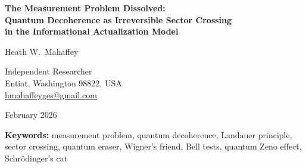 \documentclass[12pt,letterpaper]{article}
\newcommand{\IAM}{\textsc{iam}}
\newcommand{\kB}{k_{\mathrm{B}}}
\begin{document}
\doublespacing

\begin{titlepage}
\centering
\vspace*{2cm}

{\LARGE\bfseries The Measurement Problem Dissolved:\\[0.5em]
Quantum Decoherence as Irreversible Sector Crossing\\
in the Informational Actualization Model\par}

\vspace{2cm}

{\large Heath W.\ Mahaffey\par}
\vspace{0.5cm}
{\normalsize Independent Researcher\\
Entiat, Washington 98822, USA\\
\href{mailto:hmahaffeyges@gmail.com}{hmahaffeyges@gmail.com}\par}

\vspace{1.5cm}
{\normalsize February 2026\par}

\vspace{2cm}

\begin{abstract}
\noindent
The measurement problem --- what constitutes a measurement, why does
measurement cause collapse, and what role does the observer play --- has
been debated for a century. We show that the dual-sector framework of the
Informational Actualization Model (\IAM), validated at cosmological scales
through 17 converged Planck~2018 MCMC chains ($\Delta\chi^2 = +0.54$
best-fit, $\sigma_8 = 0.800$, R-1 $< 0.01$ for all chains), dissolves
the measurement problem entirely. A measurement is any irreversible
thermodynamic interaction between a quantum system and matter that
dissipates energy $Q \geq \kB T \ln 2$ (the Landauer threshold). The
photon sector ($\Sigma = 1$) is immune to gravitational decoherence; the
matter sector ($\mu < 1$) decoheres on timescales determined by the
gravitational self-energy. No observer is required. No consciousness is
involved. We apply this criterion to the double slit experiment,
Wheeler's delayed choice, the quantum eraser, Schr\"{o}dinger's cat,
entanglement and Bell tests, Wigner's friend, and the quantum Zeno
effect. Each paradox is resolved by the same mechanism: sector crossing
through irreversible information production. We derive quantitative
predictions for each case and identify three experiments that discriminate
between \IAM{} and standard quantum mechanics using existing laboratory
infrastructure.
\end{abstract}

\vspace{1cm}
{\small\noindent\textbf{Keywords:} measurement problem, quantum
decoherence, Landauer principle, sector crossing, quantum eraser,
Wigner's friend, Bell tests, quantum Zeno effect,
Schr\"{o}dinger's cat\par}

\end{titlepage}
\end{document}
